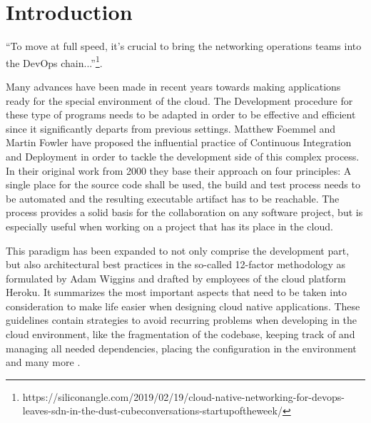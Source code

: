 	\section{Introduction}
%

``To move at full speed, it’s crucial to bring the networking operations teams into the DevOps chain...''\footnote{https://siliconangle.com/2019/02/19/cloud-native-networking-for-devops-leaves-sdn-in-the-dust-cubeconversations-startupoftheweek/}.

Many advances have been made in recent years towards making applications ready for the special environment of the cloud. The Development procedure for these type of programs needs to be adapted in order to be effective and efficient since it significantly departs from previous settings. Matthew Foemmel and Martin Fowler have proposed the influential practice of Continuous Integration and Deployment \cite{fowler_2006} \cite{fowler_foemmel_2000} in order to tackle the development side of this complex process. In their original work from 2000 they base their approach  on four principles: A single place for the source code shall be used, the build and test process needs to be automated and the resulting executable artifact has to be reachable.
The process provides a solid basis for the collaboration on any software project, but is especially useful when working on a project that has its place in the cloud. 

This paradigm has been expanded to not only comprise the development part, but also architectural best practices in the so-called 12-factor methodology as formulated by Adam Wiggins and drafted by employees of the cloud platform Heroku.  It summarizes the most important aspects that need to be taken into consideration to make life easier when designing cloud native applications. These guidelines contain strategies to avoid recurring problems when developing in the cloud environment, like the fragmentation of the codebase, keeping track of and managing all needed dependencies, placing the configuration in the environment and many more \cite{hofmann2017microservices} \cite{12Factor}. 

